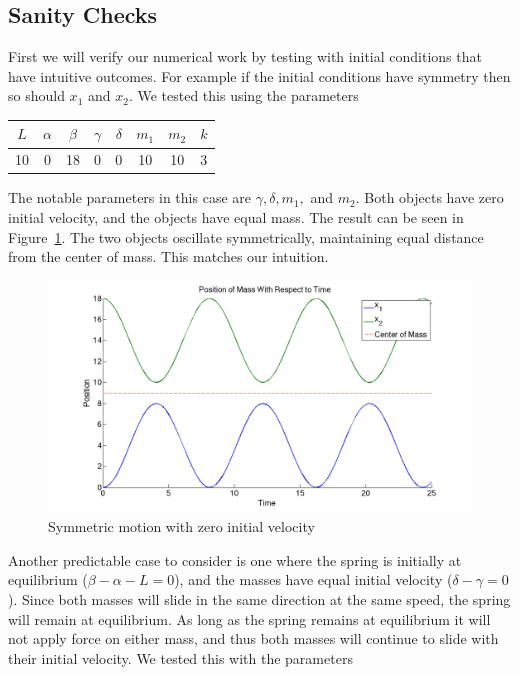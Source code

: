 \documentclass[11pt, oneside]{article}   	%
\begin{document}
\subsection{Sanity Checks}
First we will verify our numerical work by testing with initial conditions that have intuitive outcomes.
For example if the initial conditions have symmetry then so should $x_1$ and $x_2$.
We tested this using the parameters
\begin{center}

\begin{tabular}{| c | c | c | c | c | c | c | c |}

\hline

$L$ & $\alpha$ & $\beta$ & $\gamma$ & $\delta$ & $m_1$ & $m_2$ & $k$ \\

\hline

 10 & 0 & 18 & 0 & 0 & 10 & 10 & 3\\

\hline

\end{tabular}

\end{center}

The notable parameters in this case are $\gamma, \delta, m_1, $ and $m_2$.
Both objects have zero initial velocity, and the objects have equal mass.
The result can be seen in Figure~\ref{sanity1}.
The two objects oscillate symmetrically, maintaining equal distance from the center of mass.
This matches our intuition.

\begin{figure}[h!]
\centering \includegraphics[scale=0.3]{sanity1}
\caption{\label{sanity1} Symmetric motion with zero initial velocity}
\end{figure}

Another predictable case to consider is one where the spring is initially at equilibrium ($\beta - \alpha - L = 0$), and the masses have equal initial velocity ($\delta-\gamma=0$).
Since both masses will slide in the same direction at the same speed, the spring will remain at equilibrium.
As long as the spring remains at equilibrium it will not apply force on either mass, and thus both masses will continue to slide with their initial velocity.
We tested this with the parameters
\end{document}
